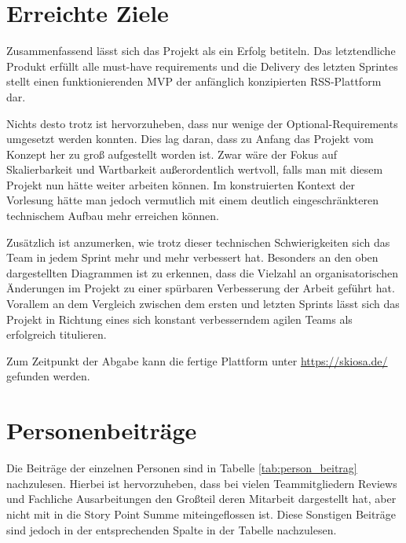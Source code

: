 \section{Erreichte Ziele}
Zusammenfassend lässt sich das Projekt als ein Erfolg betiteln.
Das letztendliche Produkt erfüllt alle must-have requirements und die Delivery des letzten Sprintes stellt einen funktionierenden \ac{MVP} der anfänglich konzipierten RSS-Plattform dar.

Nichts desto trotz ist hervorzuheben, dass nur wenige der Optional-Requirements umgesetzt werden konnten.
Dies lag daran, dass zu Anfang das Projekt vom Konzept her zu groß aufgestellt worden ist.
Zwar wäre der Fokus auf Skalierbarkeit und Wartbarkeit außerordentlich wertvoll, falls man mit diesem Projekt nun hätte weiter arbeiten können.
Im konstruierten Kontext der Vorlesung hätte man jedoch vermutlich mit einem deutlich eingeschränkteren technischem Aufbau mehr erreichen können.

Zusätzlich ist anzumerken, wie trotz dieser technischen Schwierigkeiten sich das Team in jedem Sprint mehr und mehr verbessert hat.
Besonders an den oben dargestellten Diagrammen ist zu erkennen, dass die Vielzahl an organisatorischen Änderungen im Projekt zu einer spürbaren Verbesserung der Arbeit geführt hat.
Vorallem an dem Vergleich zwischen dem ersten und letzten Sprints lässt sich das Projekt in Richtung eines sich konstant verbesserndem agilen Teams als erfolgreich titulieren.

Zum Zeitpunkt der Abgabe kann die fertige Plattform unter \url{https://skiosa.de/} gefunden werden.

\section{Personenbeiträge}
Die Beiträge der einzelnen Personen sind in Tabelle \ref{tab:person_beitrag} nachzulesen.
Hierbei ist hervorzuheben, dass bei vielen Teammitgliedern Reviews und Fachliche Ausarbeitungen den Großteil deren Mitarbeit dargestellt hat, aber nicht mit in die Story Point Summe miteingeflossen ist. 
Diese Sonstigen Beiträge sind jedoch in der entsprechenden Spalte in der Tabelle nachzulesen.

